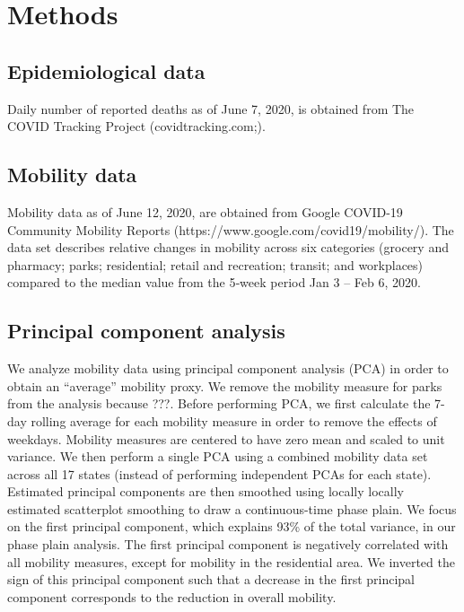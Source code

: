 \section{Methods}

\subsection{Epidemiological data}

Daily number of reported deaths as of June 7, 2020, is obtained from The COVID Tracking Project (covidtracking.com;).

\subsection{Mobility data}

Mobility data as of June 12, 2020, are obtained from Google COVID-19 Community Mobility Reports (https://www.google.com/covid19/mobility/).
The data set describes relative changes in mobility across six categories (grocery and pharmacy; parks; residential; retail and recreation; transit; and workplaces)
compared to the median value from the 5‑week period Jan 3 – Feb 6, 2020.

\subsection{Principal component analysis}

We analyze mobility data using principal component analysis (PCA) in order to obtain an ``average'' mobility proxy. We remove the mobility measure for parks from the analysis because ???. Before performing PCA, we first calculate the 7-day rolling average for each mobility measure in order to remove the effects of weekdays. 
Mobility measures are centered to have zero mean and scaled to unit variance. We then perform a single PCA using a combined mobility data set across all 17 states (instead of performing independent PCAs for each state). 
Estimated principal components are then smoothed using locally locally estimated scatterplot smoothing to draw a continuous-time phase plain.
We focus on the first principal component, which explains 93\% of the total variance, in our phase plain analysis. The first principal component is negatively correlated with all mobility measures, except for mobility in the residential area. 
We inverted the sign of this principal component such that a decrease in the first principal component corresponds to the reduction in overall mobility.
